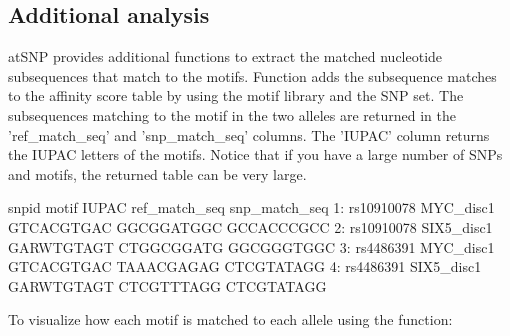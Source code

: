 \documentclass[a4paper,10pt]{article}
\begin{document}
\subsection{Additional analysis}

atSNP provides additional functions to extract the matched nucleotide subsequences that match to the motifs. Function  adds the subsequence matches to the affinity score table by using the motif library and the SNP set. The subsequences matching to the motif in the two alleles are returned in the 'ref\_match\_seq' and 'snp\_match\_seq' columns. The 'IUPAC' column returns the IUPAC letters of the motifs. Notice that if you have a large number of SNPs and motifs, the returned table can be very large.

\begin{Schunk}
\begin{Soutput}
        snpid      motif      IUPAC ref_match_seq snp_match_seq
1: rs10910078  MYC_disc1 GTCACGTGAC    GGCGGATGGC    GCCACCCGCC
2: rs10910078 SIX5_disc1 GARWTGTAGT    CTGGCGGATG    GGCGGGTGGC
3:  rs4486391  MYC_disc1 GTCACGTGAC    TAAACGAGAG    CTCGTATAGG
4:  rs4486391 SIX5_disc1 GARWTGTAGT    CTCGTTTAGG    CTCGTATAGG
\end{Soutput}
\end{Schunk}

To visualize how each motif is matched to each allele using the  function:
\end{document}
